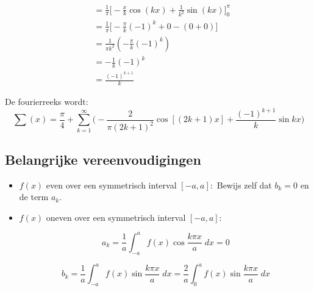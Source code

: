 {\begin{itemize}[label={}]
\begin{equation*}
\begin{split}
					      & = \frac{1}{\pi} \bigg[-\frac{x}{k}\cos(kx) + \frac{1}{k^2}\sin(kx)\bigg]_{0}^{\pi} \\
					      & = \frac{1}{\pi} \bigg[-\frac{\pi}{k}(-1)^k + 0 - ( 0 + 0)\bigg] \\
					      & = \frac{1}{\pi k^2}(-\frac{\pi}{k}(-1)^k) \\
					      & = -\frac{1}{k}(-1)^k \\
					      & = \frac{(-1)^{k + 1}}{k}
				      \end{split}
			      \end{equation*}
		\end{itemize}
		De fourierreeks wordt:
		$$\sum (x) = \frac{\pi}{4} + \sum_{k = 1}^{\infty} \bigg(-\frac{2}{\pi(2k + 1)^2}\cos[(2k + 1)x]  + \frac{(-1)^{k + 1}}{k}\sin kx\bigg)$$
	}

	\subsection{Belangrijke vereenvoudigingen}
	\begin{itemize}
		\item $f(x)$ even over een symmetrisch interval $[-a, a]:$
		      Bewijs zelf dat $b_k =0$ en de term $a_k$.
		\item $f(x)$ oneven over een symmetrisch interval $[-a, a]:$

		      $$a_k = \frac{1}{a}\int_{-a}^{a} f(x) \cos \frac{k\pi x}{a}\;dx = 0$$

		      $$b_k = \frac{1}{a}\int_{-a}^{a} f(x) \sin \frac{k\pi x}{a}\;dx = \frac{2}{a}\int_{0}^{a} f(x) \sin \frac{k\pi x}{a}\;dx $$

	\end{itemize}


